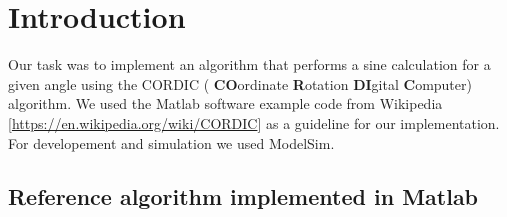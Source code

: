\section{Introduction}
Our task was to implement an algorithm that performs a sine calculation for a given angle using the CORDIC ( \textbf{CO}ordinate \textbf{R}otation \textbf{DI}gital \textbf{C}omputer) algorithm. We used the Matlab software example code from Wikipedia [\href{https://en.wikipedia.org/wiki/CORDIC}{https://en.wikipedia.org/wiki/CORDIC}] as a guideline for our implementation. For developement and simulation we used ModelSim.


\subsection{Reference algorithm implemented in Matlab}

